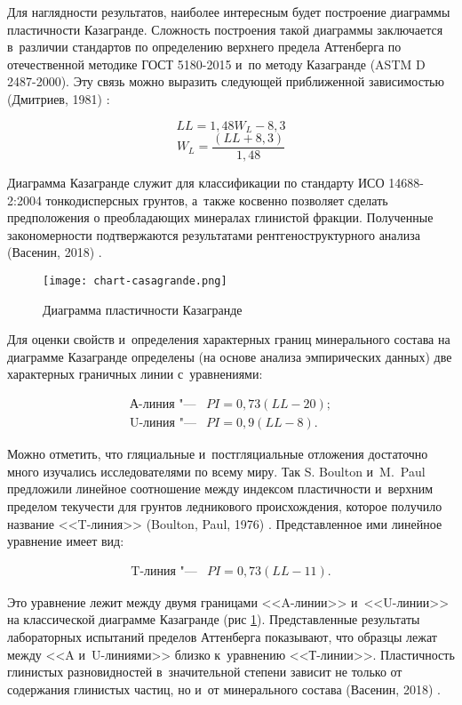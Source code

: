 Для наглядности результатов, наиболее интересным будет построение диаграммы пластичности Казагранде. Сложность построения такой диаграммы заключается в~различии  стандартов по определению верхнего предела Аттенберга по отечественной методике ГОСТ 5180-2015 и~по методу Казагранде (ASTM D 2487-2000). Эту связь можно выразить следующей приближенной зависимостью (Дмитриев, 1981) \cite{dmitriev1981}:

$$LL = 1,48W_L - 8,3$$
$$W_L = {\frac{(LL + 8,3)}{1,48}}$$

Диаграмма Казагранде служит для классификации по стандарту ИСО 14688-2:2004 тонкодисперсных грунтов, а~также косвенно позволяет сделать предположения о преобладающих минералах глинистой фракции. Полученные закономерности подтвержаются результатами рентгеноструктурного анализа (Васенин, 2018) \cite{vasenin2018}.


\begin{figure}[ht]
    \small
    \centering
    \texttt{[image: chart-casagrande.png]}
    \caption{Диаграмма пластичности Казагранде} \label{Fig:Caz}
  \end{figure}


Для оценки свойств и~определения характерных границ минерального состава на диаграмме Казагранде определены (на основе анализа эмпирических данных) две характерных граничных линии с~уравнениями:

\begin{align*}
    \text{А-линия "---} & PI = 0,73(LL - 20); \\
    \text{U-линия "---} & PI = 0,9(LL - 8).
\end{align*}

Можно отметить, что гляциальные и~постгляциальные отложения достаточно много изучались исследователями по всему миру. Так S. Boulton и~M.~Paul  предложили линейное соотношение между  индексом пластичности и~верхним пределом текучести  для грунтов ледникового происхождения, которое получило название <<T-линия>> (Boulton, Paul, 1976) \cite{boulton1976}. Представленное ими линейное уравнение имеет вид:

\begin{align*}
    \text{T-линия "---} & PI = 0,73(LL-11).
\end{align*}

Это уравнение лежит между двумя границами <<A-линии>> и~<<U-линии>> на классической диаграмме Казагранде (рис \ref{Fig:Caz}). Представленные результаты лабораторных испытаний пределов Аттенберга показывают, что образцы лежат между <<A и~U-линиями>> близко к~уравнению <<Т-линии>>. Пластичность глинистых разновидностей в~значительной степени зависит не только от содержания глинистых частиц, но и~от минерального состава (Васенин, 2018) \cite{vasenin2018}.

